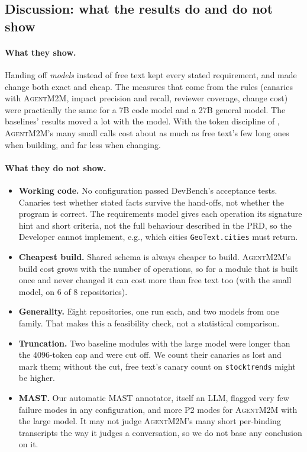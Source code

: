 \documentclass[10pt,a4paper]{article}
\newcommand{\tool}{\textsc{AgentM2M}}
\newcommand{\code}[1]{\texttt{#1}}
\theoremstyle{definition}
\begin{document}
\subsection{Discussion: what the results do and do not show}

\paragraph{What they show.} Handing off \emph{models} instead of free text
kept every stated requirement, and made change both exact and cheap. The
measures that come from the rules (canaries with \tool{}, impact precision
and recall, reviewer coverage, change cost) were practically the same for a
7B code model and a 27B general model. The baselines' results moved a lot
with the model. With the token discipline of , \tool{}'s many
small calls cost about as much as free text's few long ones when building,
and far less when changing.

\paragraph{What they do not show.}
\begin{itemize}[nosep]
\item \textbf{Working code.} No configuration passed DevBench's acceptance
tests. Canaries test whether stated facts survive the hand-offs, not whether
the program is correct. The requirements model gives each operation its
signature hint and short criteria, not the full behaviour described in the
PRD, so the Developer cannot implement, e.g., which cities
\code{GeoText.cities} must return.
\item \textbf{Cheapest build.} Shared schema is always cheaper to build.
\tool{}'s build cost grows with the number of operations, so for a module that
is built once and never changed it can cost more than free text too (with the
small model, on 6 of 8 repositories).
\item \textbf{Generality.} Eight repositories, one run each, and two models
from one family. That makes this a feasibility check, not a statistical
comparison.
\item \textbf{Truncation.} Two baseline modules with the large model were
longer than the 4096-token cap and were cut off. We count their canaries as
lost and mark them; without the cut, free text's canary count on
\texttt{stocktrends} might be higher.
\item \textbf{MAST.} Our automatic MAST annotator, itself an LLM, flagged
very few failure modes in any configuration, and more P2 modes for \tool{}
with the large model. It may not judge \tool{}'s many short per-binding
transcripts the way it judges a conversation, so we do not base any
conclusion on it.
\end{itemize}
\end{document}
